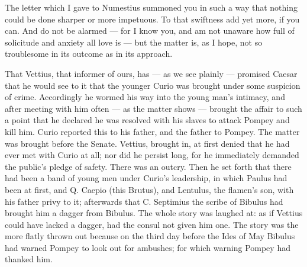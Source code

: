

 The letter which I gave to Numestius summoned you in such a way that nothing could be done sharper or more impetuous. To that swiftness add yet more, if you can. And do not be alarmed --- for I know you, and am not unaware how full of solicitude and anxiety all love is --- but the matter is, as I hope, not so troublesome in its outcome as in its approach.

 That Vettius, that informer of ours, has --- as we see plainly --- promised Caesar that he would see to it that the younger Curio was brought under some suspicion of crime. Accordingly he wormed his way into the young man's intimacy, and after meeting with him often --- as the matter shows --- brought the affair to such a point that he declared he was resolved with his slaves to attack Pompey and kill him. Curio reported this to his father, and the father to Pompey. The matter was brought before the Senate. Vettius, brought in, at first denied that he had ever met with Curio at all; nor did he persist long, for he immediately demanded the public's pledge of safety. There was an outcry. Then he set forth that there had been a band of young men under Curio's leadership, in which Paulus had been at first, and Q. Caepio (this Brutus), and Lentulus, the flamen's son, with his father privy to it; afterwards that C. Septimius the scribe of Bibulus had brought him a dagger from Bibulus. The whole story was laughed at: as if Vettius could have lacked a dagger, had the consul not given him one. The story was the more flatly thrown out because on the third day before the Ides of May Bibulus had warned Pompey to look out for ambushes; for which warning Pompey had thanked him.

